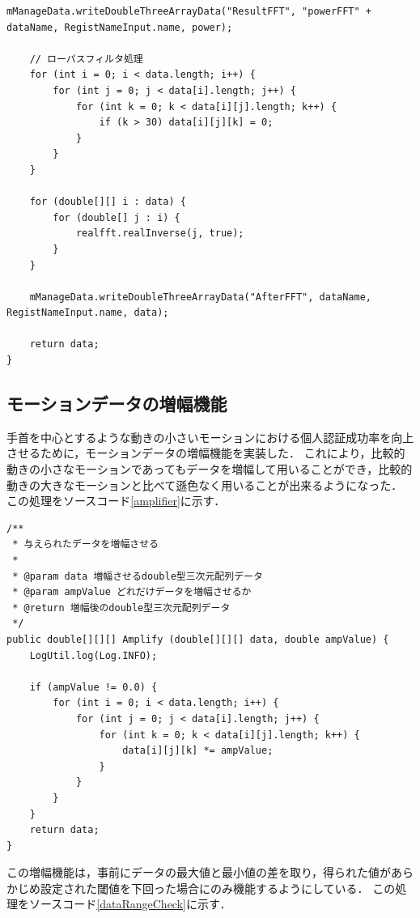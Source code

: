 \documentclass[11pt]{jreport}
\begin{document}
\begin{lstlisting}[caption=ローパスフィルタ処理, label=lowpass]
    mManageData.writeDoubleThreeArrayData("ResultFFT", "powerFFT" + dataName, RegistNameInput.name, power);

    // ローパスフィルタ処理
    for (int i = 0; i < data.length; i++) {
        for (int j = 0; j < data[i].length; j++) {
            for (int k = 0; k < data[i][j].length; k++) {
                if (k > 30) data[i][j][k] = 0;
            }
        }
    }

    for (double[][] i : data) {
        for (double[] j : i) {
            realfft.realInverse(j, true);
        }
    }

    mManageData.writeDoubleThreeArrayData("AfterFFT", dataName, RegistNameInput.name, data);

    return data;
}
        \end{lstlisting}

        \subsection{モーションデータの増幅機能}
        手首を中心とするような動きの小さいモーションにおける個人認証成功率を向上させるために，モーションデータの増幅機能を実装した．
        これにより，比較的動きの小さなモーションであってもデータを増幅して用いることができ，比較的動きの大きなモーションと比べて遜色なく用いることが出来るようになった．
        この処理をソースコード\ref{amplifier}に示す．

        \begin{lstlisting}[caption=モーションデータ増幅機能, label=amplifier]
/**
 * 与えられたデータを増幅させる
 *
 * @param data 増幅させるdouble型三次元配列データ
 * @param ampValue どれだけデータを増幅させるか   
 * @return 増幅後のdouble型三次元配列データ
 */
public double[][][] Amplify (double[][][] data, double ampValue) {
    LogUtil.log(Log.INFO);

    if (ampValue != 0.0) {
        for (int i = 0; i < data.length; i++) {
            for (int j = 0; j < data[i].length; j++) {
                for (int k = 0; k < data[i][j].length; k++) {
                    data[i][j][k] *= ampValue;
                }
            }
        }
    }
    return data;
}
        \end{lstlisting}

        この増幅機能は，事前にデータの最大値と最小値の差を取り，得られた値があらかじめ設定された閾値を下回った場合にのみ機能するようにしている．
        この処理をソースコード\ref{dataRangeCheck}に示す．
\end{document}
